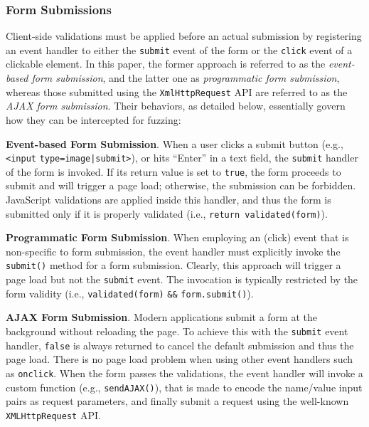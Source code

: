\documentclass[letter]{sig-alternate-2013}
\begin{document}
\subsubsection{Form Submissions}

\label{sec:crs_forms}

Client-side validations must be applied before an actual submission by registering an event handler to either the \verb"submit" event of the form or the \verb"click" event of a clickable element. In this paper, the former approach is referred to as the \textit{event-based form submission}, and the latter one as \textit{programmatic form submission}, whereas those submitted using the \verb"XmlHttpRequest" API are referred to as the \textit{AJAX form submission}. Their behaviors, as detailed below, essentially govern how they can be intercepted for fuzzing:

\textbf{Event-based Form Submission}. When a user clicks a submit button (e.g., \verb"<input" \verb"type=image|submit>"), or hits ``Enter'' in a text field, the \verb"submit" handler of the form is invoked. If its return value is set to \verb"true", the form proceeds to submit and will trigger a page load; otherwise, the submission can be forbidden. JavaScript validations are applied inside this handler, and thus the form is submitted only if it is properly validated (i.e., \verb"return validated(form)").

\textbf{Programmatic Form Submission}. When employing an (click) event that is non-specific to form submission, the event handler must explicitly invoke the \verb"submit()" method for a form submission. Clearly, this approach will trigger a page load but not the \verb"submit" event. The invocation is typically restricted by the form validity (i.e., \verb"validated(form)" \verb"&&" \verb"form.submit()").

\textbf{AJAX Form Submission}. Modern applications submit a form at the background without reloading the page. To achieve this with the \verb"submit" event handler, \verb"false" is always returned to cancel the default submission and thus the page load. There is no page load problem when using other event handlers such as \verb"onclick". When the form passes the validations, the event handler will invoke a custom function (e.g., \verb"sendAJAX()"), that is made to encode the name/value input pairs as request parameters, and finally submit a request using the well-known \verb"XMLHttpRequest" API.
\end{document}
